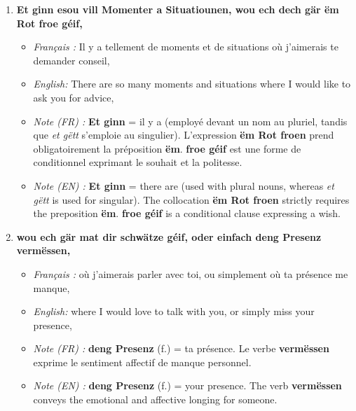 \begin{enumerate}
    \vspace{0.6em}

    \item \textbf{Et ginn esou vill Momenter a Situatiounen, wou ech dech gär ëm Rot froe géif,}
    \begin{itemize}
        \item \textit{Français :} Il y a tellement de moments et de situations où j'aimerais te demander conseil,
        \item \textit{English:} There are so many moments and situations where I would like to ask you for advice,
        \item \textit{Note (FR) :} \textbf{Et ginn} = il y a (employé devant un nom au pluriel, tandis que \textit{et gëtt} s'emploie au singulier). L'expression \textbf{ëm Rot froen} prend obligatoirement la préposition \textbf{ëm}. \textbf{froe géif} est une forme de conditionnel exprimant le souhait et la politesse.
        \item \textit{Note (EN) :} \textbf{Et ginn} = there are (used with plural nouns, whereas \textit{et gëtt} is used for singular). The collocation \textbf{ëm Rot froen} strictly requires the preposition \textbf{ëm}. \textbf{froe géif} is a conditional clause expressing a wish.
    \end{itemize}

    \vspace{0.6em}

    \item \textbf{wou ech gär mat dir schwätze géif, oder einfach deng Presenz vermëssen,}
    \begin{itemize}
        \item \textit{Français :} où j'aimerais parler avec toi, ou simplement où ta présence me manque,
        \item \textit{English:} where I would love to talk with you, or simply miss your presence,
        \item \textit{Note (FR) :} \textbf{deng Presenz} (f.) = ta présence. Le verbe \textbf{vermëssen} exprime le sentiment affectif de manque personnel.
        \item \textit{Note (EN) :} \textbf{deng Presenz} (f.) = your presence. The verb \textbf{vermëssen} conveys the emotional and affective longing for someone.
    \end{itemize}

    \vspace{0.6em}


\end{enumerate}
